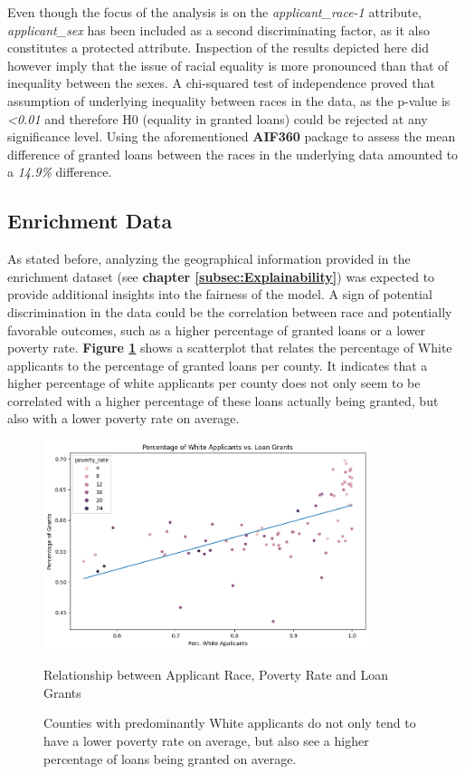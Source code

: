 Even though the focus of the analysis is on the \textit{applicant\_race-1} attribute, \textit{applicant\_sex} has been included as a second discriminating factor, as it also constitutes a protected attribute.
Inspection of the results depicted here did however imply that the issue of racial equality is more pronounced than that of inequality between the sexes.
A chi-squared test of independence proved that assumption of underlying inequality between races in the data, as the p-value is \textit{<0.01} and therefore H0 (equality in granted loans) could be rejected at any significance level.
Using the aforementioned \textbf{AIF360} package to assess the mean difference of granted loans between the races in the underlying data amounted to a \textit{14.9\%} difference.

\subsection{Enrichment Data}\label{subsec:Enrichment_Data}

As stated before, analyzing the geographical information provided in the enrichment dataset (see \textbf{chapter \ref{subsec:Explainability}}) was expected to provide additional insights into the fairness of the model.
A sign of potential discrimination in the data could be the correlation between race and potentially favorable outcomes, such as a higher percentage of granted loans or a lower poverty rate.
\textbf{Figure \ref{fig:Scatter_White_Applicants_Loan_Grant}} shows a scatterplot that relates the percentage of White applicants to the percentage of granted loans per county. It indicates that a higher percentage of white applicants per county does not only seem to be correlated with a higher percentage of these loans actually being granted, but also with a lower poverty rate on average.

\begin{figure}[!htbp]
    \centering
    \includegraphics[width=0.85\textwidth]{images/CHXX_Perc_Grants_vs_Perc_White.png}
    \caption{Relationship between Applicant Race, Poverty Rate and Loan Grants}
    \caption*{Counties with predominantly White applicants do not only tend to have a lower poverty rate on average, but also see a higher percentage of loans being granted on average.}
    \label{fig:Scatter_White_Applicants_Loan_Grant}
\end{figure}

